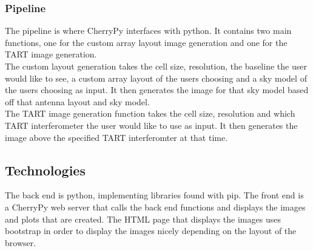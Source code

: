 \subsubsection{Pipeline}
The pipeline is where CherryPy interfaces with python. It contains two main functions, one for the custom array layout image generation and one for the TART image generation. \\The custom layout generation takes the cell size, resolution, the baseline the user would like to see, a custom array layout of the users choosing and a sky model of the users choosing as input. It then generates the image for that sky model based off that antenna layout and sky model.\\
The TART image generation function takes the cell size, resolution and which TART interferometer the user would like to use as input. It then generates the image above the specified TART interferomter at that time.

\subsection{Technologies}
The back end is python, implementing libraries found with pip. The front end is a CherryPy web server\cite{Cherrypy} that calls the back end functions and displays the images and plots that are created. The HTML page that displays the images uses bootstrap\cite{Bootstrap} in order to display the images nicely depending on the layout of the browser.

